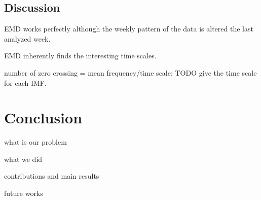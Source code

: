 \subsection{Discussion}
EMD works perfectly although the weekly pattern of the data is altered the last analyzed week.

EMD inherently finds the interesting time scales.

number of zero crossing = mean frequency/time scale:
  TODO give the time scale for each IMF.


\section{Conclusion}
what is our problem

what we did

contributions and main results

future works